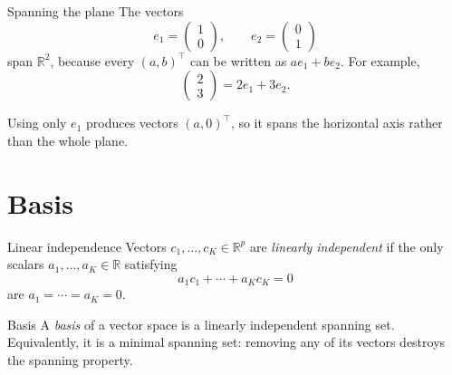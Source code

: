 \documentclass[a4paper,12pt,oneside]{report}
\begin{document}
\begin{framedexample}{Spanning the plane}
The vectors
\[
  e_1=\begin{pmatrix}1\\0\end{pmatrix},\qquad
  e_2=\begin{pmatrix}0\\1\end{pmatrix}
\]
span $\mathbb{R}^{2}$, because every $(a,b)^\top$ can be written as
$a e_1+b e_2$. For example,
\[
  \begin{pmatrix}2\\3\end{pmatrix}=2e_1+3e_2.
\]
\begin{center}
\end{center}
Using only $e_1$ produces vectors $(a,0)^\top$, so it spans the
horizontal axis rather than the whole plane.
\end{framedexample}

\clearpage
\section{Basis}

\begin{frameddefn}{Linear independence}\label{def:linear-independence}
Vectors $c_1,\ldots,c_K\in\mathbb{R}^{p}$ are \emph{linearly independent}
if the only scalars $a_1,\ldots,a_K\in\mathbb{R}$ satisfying
\[
  a_1c_1+\cdots+a_Kc_K=0
\]
are $a_1=\cdots=a_K=0$.
\end{frameddefn}

\begin{frameddefn}{Basis}\label{def:basis}
A \emph{basis} of a vector space is a linearly independent spanning
set. Equivalently, it is a minimal spanning set: removing any of its
vectors destroys the spanning property.
\end{frameddefn}
\end{document}

